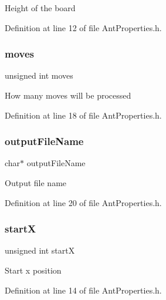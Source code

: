 Height of the board 

Definition at line 12 of file Ant\+Properties.\+h.

\mbox{\label{struct_ant_properties_ab6123efda71afe840f2cb5f45a56aae9}} 
\subsubsection{\texorpdfstring{moves}{moves}}
{\footnotesize\ttfamily unsigned int moves}

How many moves will be processed 

Definition at line 18 of file Ant\+Properties.\+h.

\mbox{\label{struct_ant_properties_ac224b2769f256d5f706fde4c2fc17a11}} 
\subsubsection{\texorpdfstring{output\+File\+Name}{outputFileName}}
{\footnotesize\ttfamily char$\ast$ output\+File\+Name}

Output file name 

Definition at line 20 of file Ant\+Properties.\+h.

\mbox{\label{struct_ant_properties_af68dab6eb68aac629f3da017fd042789}} 
\subsubsection{\texorpdfstring{startX}{startX}}
{\footnotesize\ttfamily unsigned int startX}

Start x position 

Definition at line 14 of file Ant\+Properties.\+h.

\mbox{\label{struct_ant_properties_a2cee0f2d55baab0e7dd2f97c9679bee8}} 
